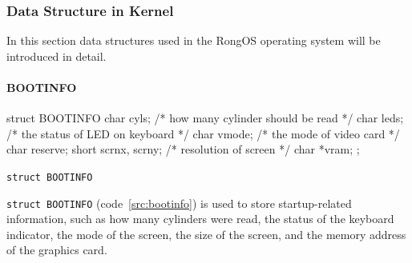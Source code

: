 \documentclass{swfcthesis}
\begin{document}
\subsubsection{Data Structure in Kernel}

In this section data structures used in the RongOS operating system will be introduced in detail.

\paragraph{BOOTINFO}

\begin{listing}[H]
  \begin{codeblock}
\begin{ccode}
struct BOOTINFO
{
  char cyls;          /* how many cylinder should be read */
  char leds;          /* the status of LED on keyboard */
  char vmode;         /* the mode of video card */
  char reserve;
  short scrnx, scrny; /* resolution of screen */
  char *vram;
};
\end{ccode}
  \end{codeblock}
  \caption{\texttt{struct BOOTINFO}}\label{src:bootinfo}
\end{listing}

\texttt{struct BOOTINFO} (code~\ref{src:bootinfo}) is used to store startup-related
information, such as how many cylinders were read, the status of the keyboard indicator,
the mode of the screen, the size of the screen, and the memory address of the graphics
card.
\end{document}
